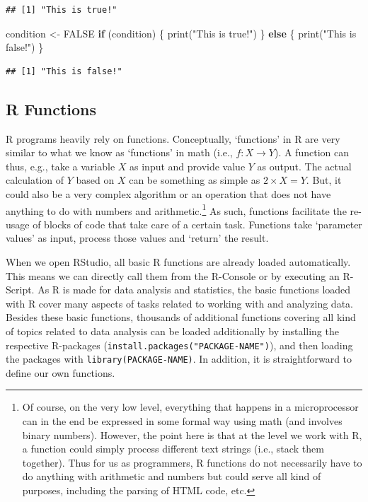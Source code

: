 \documentclass[
  12pt,
]{style/krantz}
\newenvironment{Shaded}{\begin{snugshade}}{\end{snugshade}}
\newcommand{\ConstantTok}[1]{\textcolor[rgb]{0.00,0.00,0.00}{#1}}
\newcommand{\ControlFlowTok}[1]{\textcolor[rgb]{0.13,0.29,0.53}{\textbf{#1}}}
\newcommand{\FunctionTok}[1]{\textcolor[rgb]{0.00,0.00,0.00}{#1}}
\newcommand{\NormalTok}[1]{#1}
\newcommand{\OtherTok}[1]{\textcolor[rgb]{0.56,0.35,0.01}{#1}}
\newcommand{\StringTok}[1]{\textcolor[rgb]{0.31,0.60,0.02}{#1}}
\begin{document}
\begin{verbatim}
## [1] "This is true!"
\end{verbatim}

\begin{Shaded}
\begin{Highlighting}[]
\NormalTok{condition }\OtherTok{\textless{}{-}} \ConstantTok{FALSE}
\ControlFlowTok{if}\NormalTok{ (condition) \{}
     \FunctionTok{print}\NormalTok{(}\StringTok{"This is true!"}\NormalTok{)}
\NormalTok{\} }\ControlFlowTok{else}\NormalTok{ \{}
     \FunctionTok{print}\NormalTok{(}\StringTok{"This is false!"}\NormalTok{)}
\NormalTok{\}}
\end{Highlighting}
\end{Shaded}

\begin{verbatim}
## [1] "This is false!"
\end{verbatim}

\hypertarget{r-functions}{%
\subsection{R Functions}\label{r-functions}}

R programs heavily rely on functions. Conceptually, `functions' in R are very similar to what we know as `functions' in math (i.e., \(f:X \rightarrow Y\)). A function can thus, e.g., take a variable \(X\) as input and provide value \(Y\) as output. The actual calculation of \(Y\) based on \(X\) can be something as simple as \(2\times X = Y\). But, it could also be a very complex algorithm or an operation that does not have anything to do with numbers and arithmetic.\footnote{Of course, on the very low level, everything that happens in a microprocessor can in the end be expressed in some formal way using math (and involves binary numbers). However, the point here is that at the level we work with R, a function could simply process different text strings (i.e., stack them together). Thus for us as programmers, R functions do not necessarily have to do anything with arithmetic and numbers but could serve all kind of purposes, including the parsing of HTML code, etc.} As such, functions facilitate the re-usage of blocks of code that take care of a certain task. Functions take `parameter values' as input, process those values and `return' the result.

When we open RStudio, all basic R functions are already loaded automatically. This means we can directly call them from the R-Console or by executing an R-Script. As R is made for data analysis and statistics, the basic functions loaded with R cover many aspects of tasks related to working with and analyzing data. Besides these basic functions, thousands of additional functions covering all kind of topics related to data analysis can be loaded additionally by installing the respective R-packages (\texttt{install.packages("PACKAGE-NAME")}), and then loading the packages with \texttt{library(PACKAGE-NAME)}. In addition, it is straightforward to define our own functions.
\end{document}
